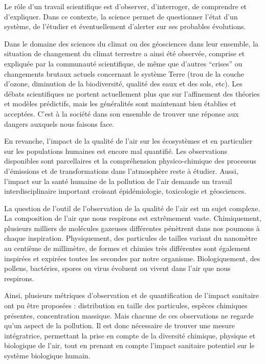 Le rôle d'un travail scientifique est d'observer, d'interroger, de comprendre et d'expliquer. 
Dans ce contexte, la science permet de questionner l'état d'un système, de l'étudier et
éventuellement d'alerter sur ses probables évolutions.

Dans le domaine des sciences du climat ou des géosciences dans leur ensemble, la situation
de changement du climat terrestre a ainsi été observée, comprise et expliquée
par la communauté scientifique, de même que d'autres ``crises'' ou changements brutaux
actuels concernant le système Terre (trou de la couche d'ozone, diminution de la
biodiversité, qualité des eaux et des sols, etc).
Les débats scientifiques ne portent actuellement plus que sur l'affinement des théories et
modèles prédictifs, mais les généralités sont maintenant bien établies et acceptées. C'est
à la société dans son ensemble de trouver une réponse aux dangers auxquels nous faisons
face.

En revanche, l'impact de la qualité de l'air sur les écosystèmes et en particulier sur les
populations humaines est encore mal quantifié. Les observations disponibles sont
parcellaires et la compréhension physico-chimique des processus d'émissions et de
transformations dans l'atmosphère reste à étudier. Aussi, l'impact sur la santé
humaine de la pollution de l'air demande un travail interdisciplinaire important croisant
épidémiologie, toxicologie et géosciences.

La question de l'outil de l'observation de la qualité de l'air est un sujet complexe. La
composition de l'air que nous respirons est extrêmement vaste. Chimiquement, plusieurs
milliers de molécules gazeuses différentes pénètrent dans nos poumons à chaque inspiration.
Physiquement, des particules de tailles variant du nanomètre au centième de millimètre, de
formes et chimies très différentes sont également inspirées et expirées toutes les
secondes par notre organisme. Biologiquement, des pollens, bactéries, spores ou virus
évoluent ou vivent dans l'air que nous respirons.

Ainsi, plusieurs métriques d'observation et de quantification de l'impact sanitaire ont pu
être proposées : distribution en taille des particules, espèces chimiques présentes,
concentration massique.
Mais chacune de ces observations ne regarde qu'un aspect de la pollution. Il est donc
nécessaire de trouver une mesure intégratrice, permettant la prise en compte de la
diversité chimique, physique et biologique de l'air, tout en prenant en compte l'impact
sanitaire potentiel sur le système biologique humain.


